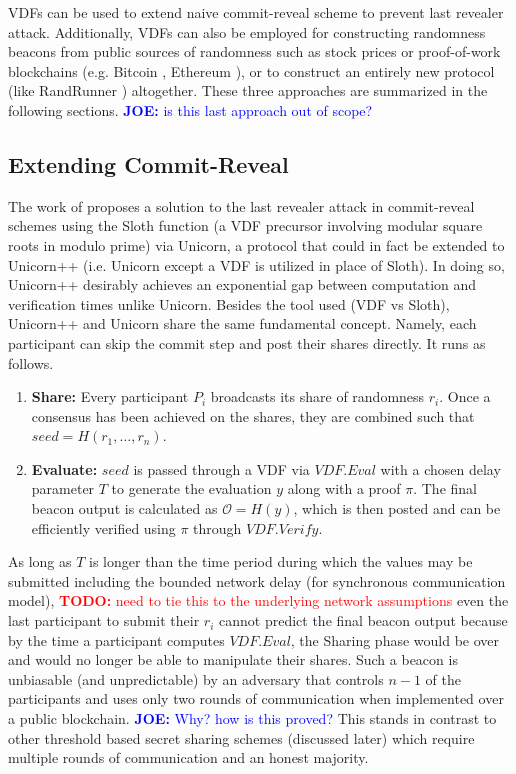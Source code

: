 \documentclass[letterpaper,twocolumn,10pt]{article}
\theoremstyle{definition}
\theoremstyle{remark}
\newcommand{\todo}[1]{\textcolor{red}{\textbf{TODO:} #1}}
\newcommand{\joenote}[1]{\textcolor{blue}{\textbf{JOE:} #1}}
\begin{document}
VDFs can be used to extend naive commit-reveal scheme to prevent last revealer attack. Additionally, VDFs can also be employed for constructing randomness beacons from public sources of randomness such as stock prices or proof-of-work blockchains (e.g. Bitcoin \cite{nakamoto2019bitcoin}, Ethereum \cite{wood2014ethereum}), or to construct an entirely new protocol (like RandRunner \cite{schindler2021randrunner}) altogether. These three approaches are summarized in the following sections.
\joenote{is this last approach out of scope?}

\subsection{Extending Commit-Reveal}
The work of \cite{lenstra2015random} proposes a solution to the last revealer attack in commit-reveal schemes using the Sloth function (a VDF precursor involving modular square roots in modulo prime) via Unicorn, a protocol that could in fact be extended to Unicorn++ (i.e. Unicorn except a VDF is utilized in place of Sloth). In doing so, Unicorn++ desirably achieves an exponential gap between computation and verification times unlike Unicorn. Besides the tool used (VDF vs Sloth), Unicorn++ and Unicorn share the same fundamental concept. Namely, each participant can skip the commit step and post their shares directly. It runs as follows.
\begin{enumerate}
    \item \textbf{Share:} Every participant $P_i$ broadcasts its share of randomness $r_i$. Once a consensus has been achieved on the shares, they are combined such that  $seed = H(r_1,\ldots, r_n)$.
    \item \textbf{Evaluate:} $seed$ is passed through a VDF via $VDF.Eval$ with a chosen delay parameter $T$ to generate the evaluation $y$ along with a proof $\pi$. The final beacon output is calculated as $\mathcal{O} = H(y) $, which is then posted and can be efficiently verified using $\pi$ through $VDF.Verify$.
\end{enumerate}
As long as $T$ is longer than the time period during which the values may be submitted including the bounded network delay (for synchronous communication model), \todo{need to tie this to the underlying network assumptions} even the last participant to submit their $r_i$ cannot predict the final beacon output because by the time a participant computes $VDF.Eval$, the Sharing phase would be over and would no longer be able to manipulate their shares. Such a beacon is unbiasable (and unpredictable) by an adversary that controls $n-1$ of the participants and uses only two rounds of communication when implemented over a public blockchain. \joenote{Why? how is this proved?} This stands in contrast to other threshold based secret sharing schemes (discussed later) which require multiple rounds of communication and an honest majority.
\end{document}

